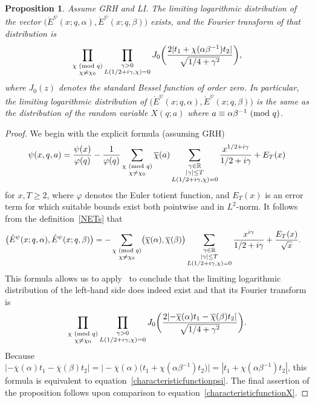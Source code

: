 \documentclass[11pt]{article}
\theoremstyle{plain}
\newtheorem{prop}[thm]{Proposition}
\theoremstyle{definition}
\numberwithin{equation}{section}
\renewcommand{\mod}[1]{{\ifmmode\text{\rm\ (mod~$#1$)}\else\discretionary{}{}{\hbox{\!\!}}\rm(mod~$#1$)\fi}}
\renewcommand{\bar}{\overline}
\newcommand{\Edot}{\mathord{\mathring E}}
\newcommand{\R}{\mathbb R}
\newcommand{\Xva}{X}
\newcommand{\0}{{\vec 0}}
\begin{document}
\begin{prop} \label{proposition ANS}
Assume GRH and LI. The limiting logarithmic distribution of the vector $\bigl( \Edot^\psi(x;q,\alpha),\Edot^\psi(x;q,\beta) \bigr)$ exists, and the Fourier transform of that distribution is
\begin{equation} \label{characteristicfunctionpsi}
\prod_{\substack{\chi\mod{q}\\ \chi\neq \chi_0}} \prod_{\substack{\gamma>0\\ L(1/2+i\gamma,\chi)=0}} J_0\biggl( \frac{2|t_1+\chi(\alpha\beta^{-1})t_2|}{\sqrt{1/4+\gamma^2}} \biggr),
\end{equation}
where $J_0(z)$ denotes the standard Bessel function of order zero. In particular, the limiting logarithmic distribution of $\bigl( \Edot^\psi(x;q,\alpha),\Edot^\psi(x;q,\beta) \bigr)$ is the same as the distribution of the random variable $\Xva(q;a)$ where $a\equiv\alpha\beta^{-1}\mod q$.
\end{prop}

\begin{proof}
We begin with the explicit formula (assuming GRH)
\begin{align*}
\psi(x,q,a) = 
\frac{\psi(x)}{\varphi(q)} - \frac1{\varphi(q)}\sum_{\substack{\chi\mod{q}\\\chi\neq \chi_0}}\bar{\chi}(a)\sum_{\substack{\gamma\in\R \\ |\gamma|\le T \\ L(1/2+i\gamma,\chi)=0}}\frac{x^{1/2+i\gamma}}{1/2+i\gamma} + E_T(x)
\end{align*}
for $x,T\ge2$,
where $\varphi$ denotes the Euler totient function, and $E_T(x)$ is an error term for which suitable bounds exist both pointwise and in $L^2$-norm. It follows from the definition~\eqref{NETs} that
\begin{align*}
\bigl( \Edot^\psi(x;q,\alpha),\Edot^\psi(x;q,\beta) \bigr) &= - \sum_{\substack{\chi\mod{q}\\\chi\neq \chi_0}} \bigl( \bar{\chi}(\alpha), \bar{\chi}(\beta) \bigr) \sum_{\substack{\gamma\in\R \\ |\gamma|\le T \\ L(1/2+i\gamma,\chi)=0}}\frac{x^{i\gamma}}{1/2+i\gamma} + \frac{E_T(x)}{\sqrt x}.
\end{align*}
This formula allows us to apply~\cite[Theorem~1.9]{ANS} to conclude that the limiting logarithmic distribution of the left-hand side does indeed exist and that its Fourier transform is
\[
\prod_{\substack{\chi\mod{q}\\ \chi\neq \chi_0}} \prod_{\substack{\gamma>0\\ L(1/2+i\gamma,\chi)=0}} J_0\biggl( \frac{2|{-}\bar\chi(\alpha)t_1-\bar\chi(\beta)t_2|}{\sqrt{1/4+\gamma^2}} \biggr).
\]
Because $|{-}\bar\chi(\alpha)t_1-\bar\chi(\beta)t_2| = \bigl| {-}\bar\chi(\alpha) \bigl( t_1+\chi(\alpha\beta^{-1})t_2 \bigr) \bigr| = |t_1+\chi(\alpha\beta^{-1})t_2|$,
this formula is equivalent to equation~\eqref{characteristicfunctionpsi}. The final assertion of the proposition follows upon comparison to equation~\eqref{characteristicfunctionX}. 
\end{proof}
\end{document}
